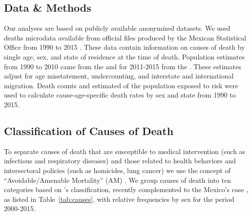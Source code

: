\documentclass[11.5pt]{article}
\begin{document}
\begin{spacing}{1.5}
\section*{Data \& Methods} 
Our analyses are based on publicly available anonymized datasets. We used deaths microdata available from official files produced by the
Mexican Statistical Office from 1990 to 2015 \citep{INEGI}. These data contain
information on causes of death by single age, sex, and state of residence at the
time of death. Population estimates from 1990 to 2010 came from the \citet{SOMEDE} and for 2011-2015 from the \citet{CONAPO}. These estimates adjust for age misstatement, undercounting, and interstate and international migration. Death counts and estimated of the population exposed to risk were used to calculate cause-age-specific death rates by sex and state from 1990 to 2015.

\subsection*{Classification of Causes of Death}

To separate causes of death that are susceptible to medical intervention (such as
infectious and respiratory diseases) and those related to health behaviors and
intersectoral policies (such as homicides, lung cancer) we use the concept of
``Avoidable/Amenable Mortality'' (AM) \citep{nolte&mckee2004, nolte&mckee2008}. We group causes of death into ten categories based on \citet{elo2014}'s classification, recently complemented to the  Mexico's case \citep{Aburto2015}, as listed in Table~\ref{tab:causes}, with relative frequencies by sex for the period 2000-2015.


\end{spacing}
\end{document}
